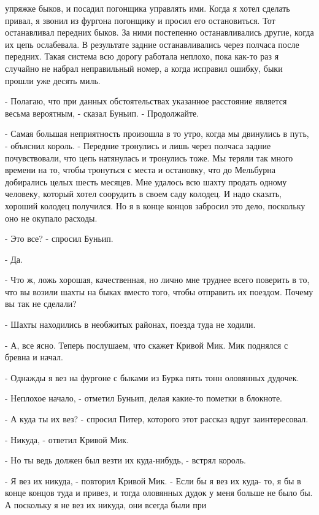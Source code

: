 упряжке быков, и посадил погонщика управлять ими. Когда я хотел 
сделать привал, я звонил из фургона погонщику и просил его 
остановиться. Тот останавливал передних быков. За ними постепенно 
останавливались другие, когда их цепь ослабевала. В результате задние 
останавливались через полчаса после передних. Такая система всю дорогу 
работала неплохо, пока как-то раз я случайно не набрал неправильный 
номер, а когда исправил ошибку, быки прошли уже десять миль.
\par- Полагаю, что при данных обстоятельствах указанное расстояние 
является весьма вероятным, - сказал Буньип. - Продолжайте.
\par- Самая большая неприятность произошла в то утро, когда мы 
двинулись в путь, - объяснил король. - Передние тронулись и лишь через 
полчаса задние почувствовали, что цепь натянулась и тронулись тоже. Мы 
теряли так много времени на то, чтобы тронуться с места и остановку, 
что до Мельбурна добирались целых шесть месяцев. Мне удалось всю шахту 
продать одному человеку, который хотел соорудить в своем саду колодец. 
И надо сказать, хороший колодец получился. Но я в конце концов 
забросил это дело, поскольку оно не окупало расходы.
\par- Это все? - спросил Буньип.
\par- Да.
\par- Что ж, ложь хорошая, качественная, но лично мне труднее всего 
поверить в то, что вы возили шахты на быках вместо того, чтобы 
отправить их поездом. Почему вы так не сделали?
\par- Шахты находились в необжитых районах, поезда туда не ходили.
\par- А, все ясно. Теперь послушаем, что скажет Кривой Мик.
 Мик поднялся с бревна и начал.
\par- Однажды я вез на фургоне с быками из Бурка пять тонн оловянных 
дудочек.
\par- Неплохое начало, - отметил Буньип, делая какие-то пометки в 
блокноте.
\par- А куда ты их вез? - спросил Питер, которого этот рассказ вдруг 
заинтересовал.
\par- Никуда, - ответил Кривой Мик.
\par- Но ты ведь должен был везти их куда-нибудь, - встрял король.
\par- Я вез их никуда, - повторил Кривой Мик. - Если бы я вез их куда-
то, я бы в конце концов туда и привез, и тогда оловянных дудок у меня 
больше не было бы. А поскольку я не вез их никуда, они всегда были при 
